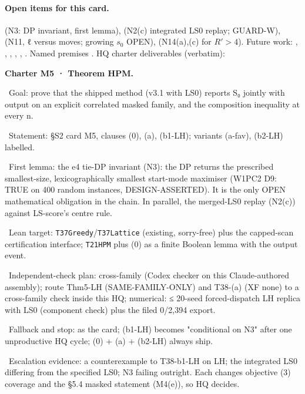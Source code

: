 \paragraph{Open items for this card.}  (N3: DP invariant, first lemma),  (N2(c) integrated LS0 replay; GUARD-W),  (N11, ℓ versus moves; growing $s_0$ OPEN),  (N14(a),(c) for $R'>4$). Future work: , , , , , . Named premises . HQ charter deliverables (verbatim):
\par\noindent \textbf{Charter M5 · Theorem HPM.}
\par\noindent \textbullet~Goal: prove that the shipped method (v3.1 with LS0) reports S₀ jointly with output on an explicit correlated masked family, and the composition inequality at every n.
\par\noindent \textbullet~Statement: §S2 card M5, clauses (0), (a), (b1-LH); variants (a-fav), (b2-LH) labelled.
\par\noindent \textbullet~First lemma: the e4 tie-DP invariant (N3): the DP returns the prescribed smallest-size, lexicographically smallest start-mode maximiser (W1PC2 D9: TRUE on 400 random instances, DESIGN-ASSERTED). It is the only OPEN mathematical obligation in the chain. In parallel, the merged-LS0 replay (N2(c)) against LS-score's centre rule.
\par\noindent \textbullet~Lean target: \texttt{T37Greedy}/\texttt{T37Lattice} (existing, sorry-free) plus the capped-scan certification interface; \texttt{T21HPM} plus (0) as a finite Boolean lemma with the output event.
\par\noindent \textbullet~Independent-check plan: cross-family (Codex checker on this Claude-authored assembly); route Thm5-LH (SAME-FAMILY-ONLY) and T38-(a) (XF none) to a cross-family check inside this HQ; numerical: ≤ 20-seed forced-dispatch LH replica with LS0 (component check) plus the filed 0/2,394 export.
\par\noindent \textbullet~Fallback and stop: as the card; (b1-LH) becomes "conditional on N3" after one unproductive HQ cycle; (0) + (a) + (b2-LH) always ship.
\par\noindent \textbullet~Escalation evidence: a counterexample to T38-b1-LH on LH; the integrated LS0 differing from the specified LS0; N3 failing outright. Each changes objective (3) coverage and the §5.4 masked statement (M4(e)), so HQ decides.

